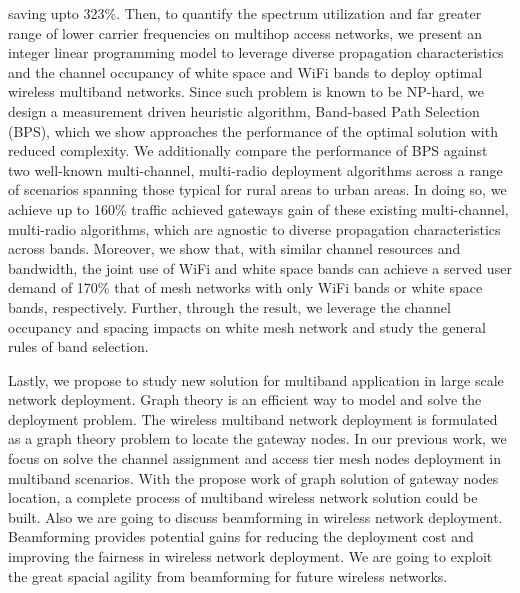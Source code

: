 saving upto 323\%. 
Then, to quantify the spectrum utilization and far greater range of lower carrier 
frequencies on multihop access networks, 
we present an integer 
linear programming model to leverage diverse propagation characteristics and 
the  channel occupancy of white space and WiFi bands to deploy optimal wireless multiband 
networks. Since such problem is known to be NP-hard, we design a measurement driven 
heuristic algorithm, Band-based Path Selection (BPS), which we show approaches 
the performance of the optimal solution with reduced complexity.  We additionally 
compare the performance of BPS against two well-known multi-channel, multi-radio 
deployment algorithms across a range of scenarios spanning those typical for 
rural areas to urban areas. In doing so, we achieve up to 160\% traffic achieved 
gateways gain of these existing multi-channel, multi-radio algorithms, which are 
agnostic to diverse propagation characteristics across bands.  Moreover, we show 
that, with similar channel resources and bandwidth, the joint use of WiFi and 
white space bands can achieve a served user demand of 170\% that of mesh networks 
with only WiFi bands or white space bands, respectively. Further, through the 
result, we leverage the channel occupancy and spacing impacts on white mesh
network and study the general rules of band selection.

Lastly, we propose to study new solution for multiband application in large 
scale network deployment. Graph theory is an efficient way to model and solve 
the deployment problem. The wireless multiband network deployment is formulated
as a graph theory problem to locate the gateway nodes. In our previous work,
we focus on solve the channel assignment and access tier mesh nodes deployment
in multiband scenarios. With the propose work of graph solution of gateway nodes
location, a complete process of multiband wireless network solution could be 
built. Also we are going to discuss beamforming in wireless network deployment. 
Beamforming provides potential gains for reducing the deployment cost and improving
the fairness in wireless network deployment. We are going to exploit the great
spacial agility from beamforming for future wireless networks.

